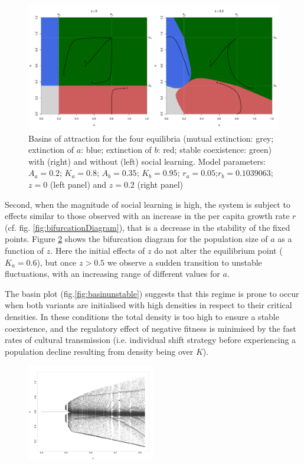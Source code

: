 \documentclass[review,authoryear]{elsarticle}
\begin{document}
\begin{figure}
  \centering
      \includegraphics[width=\columnwidth]{./figures/figure3.pdf}
  \caption{Basins of attraction for the four equilibria (mutual extinction: grey; extinction of $a$: blue; extinction of $b$: red; stable coexistence: green) with (right) and without (left) social learning. Model parameters: $A_a=0.2$; $K_a=0.8$; $A_b=0.35$; $K_b=0.95$; $r_a=0.05$;$r_b=0.1039063$; $z=0$ (left panel) and $z=0.2$ (right panel) } 
    \label{fig:TransmissionBasin}
\end{figure}


Second, when the magnitude of social learning is high, the system is subject to effects similar to those observed with an increase in the per capita growth rate $r$ (cf. fig. \ref{fig:bifurcationDiagram}), that is a decrease in the stability of the fixed points. Figure \ref{fig:BifurcationSocialLearning} shows the bifurcation diagram for the population size of $a$ as a function of $z$. Here the initial effects of $z$ do not alter the equilibrium point ($K_a=0.6$), but once $z>0.5$ we observe a sudden transition to unstable fluctuations, with an increasing range of different values for $a$. %

The basin plot (fig.\ref{fig:basinunstable}) suggests that this regime is prone to occur when both variants are initialised with high densities in respect to their critical densities. In these conditions the total density is too high to ensure a stable coexistence, and the regulatory effect of negative fitness is minimised by the fast rates of cultural transmission (i.e. individual shift strategy before experiencing a population decline resulting from density being over $K$). 


\begin{figure}
  \centering
      \includegraphics[width=0.5\textwidth]{./figures/figure4.jpg}
  \caption{}
    \label{fig:BifurcationSocialLearning}
\end{figure}
\end{document}
